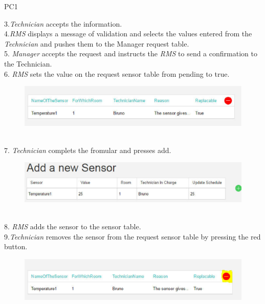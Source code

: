 \begin{lyxlist}{PC1}
{3.\emph{Technician} accepts the information.\\

4.\emph{RMS} displays a message of validation and selects the values entered
from the \emph{Technician} and pushes them to the Manager request table.\\

5. \emph{Manager} accepts the request and instructs the \emph{RMS} to send a
confirmation to the Technician.\\

6. \emph{RMS} sets the value on the request sensor table from pending to true.\\
 \begin{figure}[h]
\includegraphics[width=1\textwidth]{images/AskForANewSensorTrue.eps}
\end{figure}\\

7. \emph{Technician} complets the fromular and presses add.\\
 \begin{figure}[h]
\includegraphics[width=1\textwidth]{images/AddANewSensorTechnician.eps}
\end{figure}\\

8. \emph{RMS} adds the sensor to the sensor table.\\

9.\emph{Technician} removes the sensor from the request sensor table by
pressing the red button.\\

 \begin{figure}[h]
\includegraphics[width=1\textwidth]{images/RemoveSensorFromSensorRequestListTechnician.eps}
\end{figure}

}
\end{lyxlist}
